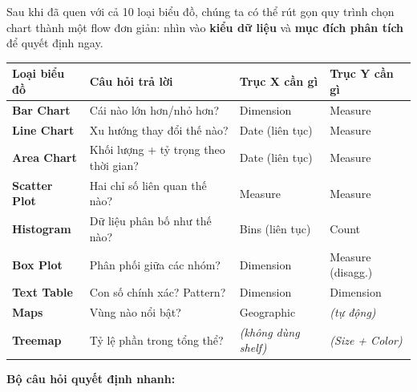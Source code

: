 \documentclass[12pt]{article}
\begin{document}
\noindent Sau khi đã quen với cả 10 loại biểu đồ, chúng ta có thể rút gọn quy trình chọn chart thành một flow đơn giản: nhìn vào \textbf{kiểu dữ liệu} và \textbf{mục đích phân tích} để quyết định ngay.

\begin{center}
\renewcommand{\arraystretch}{1.3}
\small
\begin{tabularx}{\linewidth}{l X l l}
\toprule
\textbf{Loại biểu đồ} & \textbf{Câu hỏi trả lời} & \textbf{Trục X cần gì} & \textbf{Trục Y cần gì} \\
\midrule
\textbf{Bar Chart} & Cái nào lớn hơn/nhỏ hơn? & Dimension & Measure \\
\textbf{Line Chart} & Xu hướng thay đổi thế nào? & Date (liên tục) & Measure \\
\textbf{Area Chart} & Khối lượng + tỷ trọng theo thời gian? & Date (liên tục) & Measure \\
\textbf{Scatter Plot} & Hai chỉ số liên quan thế nào? & Measure & Measure \\
\textbf{Histogram} & Dữ liệu phân bố như thế nào? & Bins (liên tục) & Count \\
\textbf{Box Plot} & Phân phối giữa các nhóm? & Dimension & Measure (disagg.) \\
\textbf{Text Table} & Con số chính xác? Pattern? & Dimension & Dimension \\
\textbf{Maps} & Vùng nào nổi bật? & Geographic & \textit{(tự động)} \\
\textbf{Treemap} & Tỷ lệ phần trong tổng thể? & \textit{(không dùng shelf)} & \textit{(Size + Color)} \\
\bottomrule
\end{tabularx}
\end{center}

\noindent \textbf{Bộ câu hỏi quyết định nhanh:}
\end{document}
